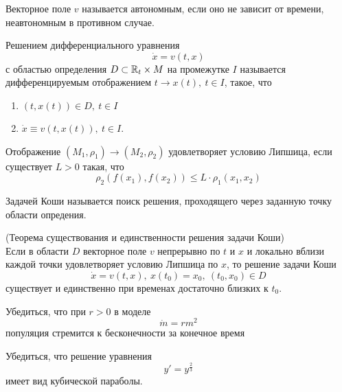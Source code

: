 \begin{definition}
    Векторное поле $v$ называется автономным, если оно не зависит от времени, неавтономным в противном случае.
\end{definition} 
\begin{definition}
    Решением дифференциального уравнения
    \[\dot{x}=v(t,x)\]
    с областью определения $D\subset \mathbb{R}_t\times M$ на промежутке $I$ называется дифференцируемым отображением $t \to x(t),\ t\in I$, такое, что
    \begin{enumerate}
        \item $(t,x(t))\in D,\ t\in I$
        \item $\dot{x}\equiv v(t, x(t)),\ t\in I$.
    \end{enumerate}
\end{definition} 
\begin{definition}
    Отображение $(M_1,\rho_1) \to (M_2, \rho_2)$ удовлетворяет условию Липшица, если существует $L>0$ такая, что
    \[\rho_2(f(x_1),f(x_2))\leq L\cdot\rho_1(x_1,x_2)\]
\end{definition} 
\begin{definition}
    Задачей Коши называется поиск решения, проходящего через заданную точку области опредения.
\end{definition} 
\begin{theorem} (Теорема существования и единственности решения задачи Коши)\\
    Если в области $D$ векторное поле $v$ непрерывно по $t$ и $x$ и локально вблизи каждой точки удовлетворяет условию Липшица по $x$, то решение задачи Коши 
    \[\dot{x}=v(t,x),\ x(t_0)=x_0,\ (t_0, x_0)\in D\]
    существует и единственно при временах достаточно близких к $t_0$. %
\end{theorem} 
\begin{exercise} Убедиться, что при $r>0$ в моделе
    \[\dot{m}=rm^2\]
    популяция стремится к бесконечности за конечное время
\end{exercise}
\begin{exercise} Убедиться, что решение уравнения
    \[y'=y^{\frac{2}{3}}\]
    имеет вид кубической параболы.
\end{exercise}